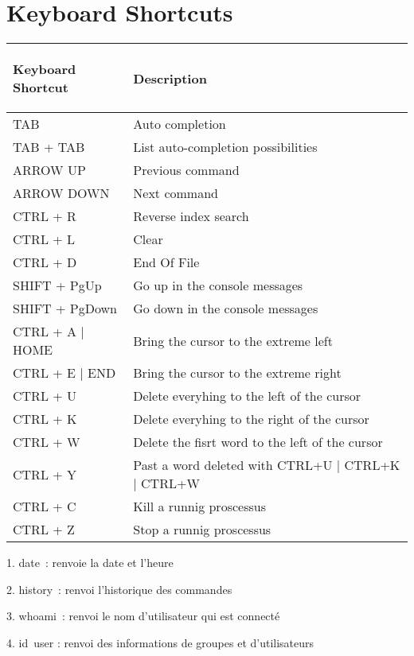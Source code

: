 \documentclass[a4paper, 10pt, onecolumn, openright, oneside]{book}
\begin{document}
\part{Keyboard Shortcuts}
	\begin{center}
		\begin{tabular}{|l|l|}
			\hline
			\begin{bf}Keyboard Shortcut\end{bf} & \begin{bf}Description\end{bf} \\
			\hline
			TAB & Auto completion \\
			TAB + TAB & List auto-completion possibilities \\
			ARROW UP & Previous command \\
			ARROW DOWN & Next command \\
			CTRL + R & Reverse index search \\
			CTRL + L & Clear \\
			CTRL + D & End Of File \\
			SHIFT + PgUp & Go up in the console messages \\
			SHIFT + PgDown & Go down in the console messages \\
			CTRL + A $\vert$ HOME & Bring the cursor to the extreme left \\
			CTRL + E $\vert$ END & Bring the cursor to the extreme right \\
			CTRL + U & Delete everyhing to the left of the cursor \\
			CTRL + K & Delete everyhing to the right of the cursor \\
			CTRL + W & Delete the fisrt word to the left of the cursor \\
			CTRL + Y & Past a word deleted with CTRL+U $\vert$ CTRL+K $\vert$ CTRL+W \\
			CTRL + C & Kill a runnig proscessus \\
			CTRL + Z & Stop a runnig proscessus \\
			\hline
		\end{tabular}
	\end{center}


    1. date : renvoie la date et l’heure

    2. history : renvoi l'historique des commandes

    3. whoami : renvoi le nom d'utilisateur qui est connecté

    4. id user : renvoi des informations de groupes et d’utilisateurs
\end{document}

